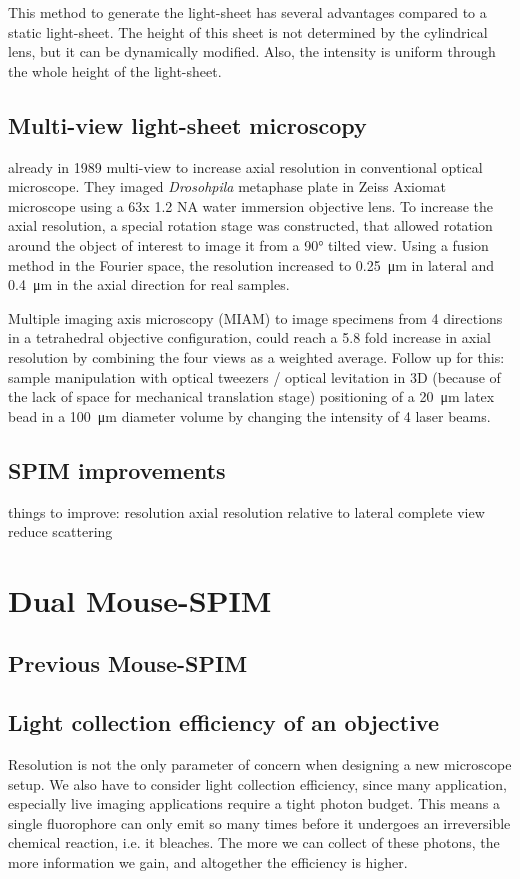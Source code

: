 \documentclass{diploma_style}
\begin{document}
This method to generate the light-sheet has several advantages compared to a static light-sheet. The height of this sheet is not determined by the cylindrical lens, but it can be dynamically modified. Also, the intensity is uniform through the whole height of the light-sheet.

\section{Multi-view light-sheet microscopy}
already in 1989 multi-view to increase axial resolution in conventional optical microscope. They imaged \textit{Drosohpila} metaphase plate in Zeiss Axiomat microscope using a 63x 1.2 NA water immersion objective lens. To increase the axial resolution, a special rotation stage was constructed, that allowed rotation around the object of interest to image it from a 90\si{\degree} tilted view. Using a fusion method in the Fourier space, the resolution increased to \SI{0.25}{\micro\meter} in lateral and \SI{0.4}{\micro\meter} in the axial direction for real samples.

Multiple imaging axis microscopy (MIAM) \cite{swoger_multiple_2003}
to image specimens from 4 directions in a tetrahedral objective configuration, could reach a 5.8 fold increase in axial resolution by combining the four views as a weighted average.
Follow up for this: sample manipulation with optical tweezers / optical levitation in 3D \cite{huisken_three-dimensional_2007}(because of the lack of space for mechanical translation stage)
positioning of a \SI{20}{\micro m} latex bead in a \SI{100}{\micro m} diameter volume by changing the intensity of 4 laser beams. 

\section{SPIM improvements}
things to improve: resolution
axial resolution relative to lateral
complete view
reduce scattering

\chapter{Dual Mouse-SPIM}
    \section{Previous Mouse-SPIM}
    \section{Light collection efficiency of an objective}
    Resolution is not the only parameter of concern when designing a new microscope setup. We also have to consider light collection efficiency, since many application, especially live imaging applications require a tight photon budget. This means a single fluorophore can only emit so many times before it undergoes an irreversible chemical reaction, i.e. it bleaches. The more we can collect of these photons, the more information we gain, and altogether the efficiency is higher.
    
\end{document}
